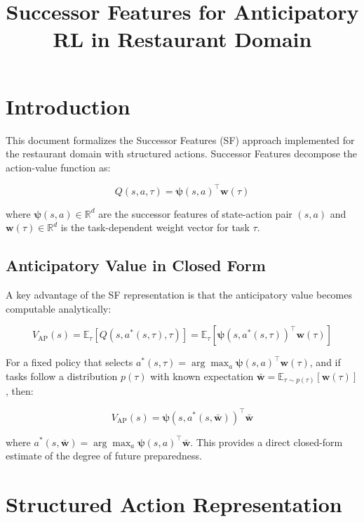 \documentclass[11pt]{article}
\title{Successor Features for Anticipatory RL in Restaurant Domain}
\author{}
\date{}
\begin{document}
\maketitle

\section{Introduction}

This document formalizes the Successor Features (SF) approach implemented for the restaurant domain with structured actions. Successor Features decompose the action-value function as:

\begin{equation}
Q(s, a, \tau) = \bm{\psi}(s, a)^\top \mathbf{w}(\tau)
\end{equation}

where $\bm{\psi}(s, a) \in \mathbb{R}^d$ are the successor features of state-action pair $(s,a)$ and $\mathbf{w}(\tau) \in \mathbb{R}^d$ is the task-dependent weight vector for task $\tau$.

\subsection{Anticipatory Value in Closed Form}

A key advantage of the SF representation is that the anticipatory value becomes computable analytically:

\begin{equation}
V_{\text{AP}}(s) = \mathbb{E}_{\tau}[Q(s, a^*(s, \tau), \tau)] = \mathbb{E}_{\tau}[\bm{\psi}(s, a^*(s, \tau))^\top \mathbf{w}(\tau)]
\end{equation}

For a fixed policy that selects $a^*(s, \tau) = \arg\max_a \bm{\psi}(s, a)^\top \mathbf{w}(\tau)$, and if tasks follow a distribution $p(\tau)$ with known expectation $\bar{\mathbf{w}} = \mathbb{E}_{\tau \sim p(\tau)}[\mathbf{w}(\tau)]$, then:

\begin{equation}
V_{\text{AP}}(s) = \bm{\psi}(s, a^*(s, \bar{\mathbf{w}}))^\top \bar{\mathbf{w}}
\end{equation}

where $a^*(s, \bar{\mathbf{w}}) = \arg\max_a \bm{\psi}(s, a)^\top \bar{\mathbf{w}}$. This provides a direct closed-form estimate of the degree of future preparedness.

\section{Structured Action Representation}
\end{document}
